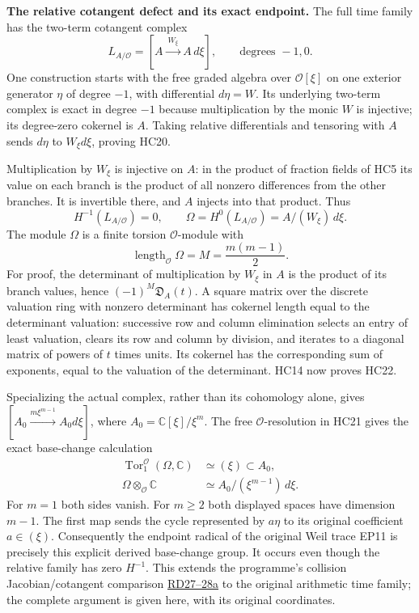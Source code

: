 \HC\textbf{The relative cotangent defect and its exact endpoint.}
The full time family has the two-term cotangent complex
\[
 L_{A/\mathcal O}=[A\xrightarrow{\ W_\xi\ }A\,d\xi],
       \qquad\text{degrees }-1,0.
 \tag{HC20}
\]
One construction starts with the free graded algebra over
$\mathcal O[\xi]$ on one exterior generator $\eta$ of degree $-1$,
with differential $d\eta=W$. Its underlying two-term complex is
exact in degree $-1$ because multiplication by the monic $W$ is
injective; its degree-zero cokernel is $A$. Taking relative
differentials and tensoring with $A$ sends $d\eta$ to
$W_\xi d\xi$, proving HC20.

Multiplication by $W_\xi$ is injective on $A$: in the product of
fraction fields of HC5 its value on each branch is the product
of all nonzero differences from the other branches. It is invertible
there, and $A$ injects into that product. Thus
\[
 H^{-1}(L_{A/\mathcal O})=0,\qquad
 \Omega=H^0(L_{A/\mathcal O})=A/(W_\xi)\,d\xi.
 \tag{HC21}
\]
The module $\Omega$ is a finite torsion $\mathcal O$-module with
\[
 \operatorname{length}_{\mathcal O}\Omega=M=\frac{m(m-1)}2.
 \tag{HC22}
\]
For proof, the determinant of multiplication by $W_\xi$ in $A$
is the product of its branch values, hence
$(-1)^M\mathfrak D_A(t)$. A square matrix over the discrete
valuation ring with nonzero determinant has cokernel length equal
to the determinant valuation: successive row and column elimination
selects an entry of least valuation, clears its row and column by
division, and iterates to a diagonal matrix of powers of $t$ times
units. Its cokernel has the corresponding sum of exponents, equal
to the valuation of the determinant. HC14 now proves HC22.

Specializing the actual complex, rather than its cohomology alone,
gives $[A_0\xrightarrow{m\xi^{m-1}}A_0d\xi]$, where
$A_0=\mathbb C[\xi]/\xi^m$. The free $\mathcal O$-resolution
in HC21 gives the exact base-change calculation
\[
 \begin{split}
 \operatorname{Tor}_1^{\mathcal O}(\Omega,\mathbb C)
    &\simeq(\xi)\subset A_0,\\
 \Omega\otimes_{\mathcal O}\mathbb C
    &\simeq A_0/(\xi^{m-1})\,d\xi.
 \end{split}
 \tag{HC23}
\]
For $m=1$ both sides vanish. For $m\ge2$ both displayed spaces
have dimension $m-1$. The first map sends the cycle represented
by $a\eta$ to its original coefficient $a\in(\xi)$.
Consequently the endpoint radical of the original Weil trace
EP11 is precisely this explicit derived base-change group.
It occurs even though the relative family has zero $H^{-1}$.
This extends the programme's collision Jacobian/cotangent
comparison \href{https://github.com/KokunoYumeto/zeta-function-research-reader/blob/5a89872598df0902b7c1393cf8e4692ca3010a95/workbenches/splitzero-tandem/branches/tau-zero-prime-positivity/COLLISION_RESIDUE_DUALITY_DERIVATION.md}{RD27--28a}
to the original arithmetic time family;
the complete argument is given here, with its original coordinates.

